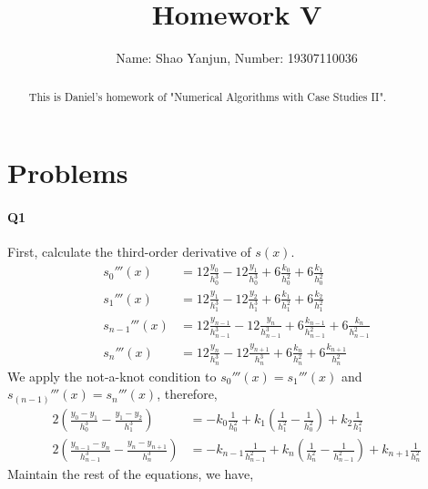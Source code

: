 \documentclass[11pt]{article}
\title{Homework V}
\author{Name: Shao Yanjun, Number: 19307110036}
\begin{document}
\maketitle

\begin{abstract}
This is Daniel's homework of  "Numerical Algorithms with Case Studies II".
\end{abstract}
\section{Problems}
\paragraph{Q1}
First, calculate the third-order derivative of $s(x)$.
\begin{align}
	s_0'''(x)&=12\frac{y_0}{h_0^3}-12\frac{y_1}{h_0^3}+6\frac{k_0}{h_0^2}+6\frac{k_1}{h_0^2}\\
	s_1'''(x)&=12\frac{y_1}{h_1^3}-12\frac{y_2}{h_1^3}+6\frac{k_1}{h_1^2}+6\frac{k_2}{h_1^2}\\
	s_{n-1}'''(x)&=12\frac{y_{n-1}}{h_{n-1}^3}-12\frac{y_{n}}{h_{n-1}^3}+6\frac{k_{n-1}}{h_{n-1}^2}+6\frac{k_{n}}{h_{n-1}^2}\\
	s_{n}'''(x)&=12\frac{y_{n}}{h_{n}^3}-12\frac{y_{n+1}}{h_{n}^3}+6\frac{k_{n}}{h_{n}^2}+6\frac{k_{n+1}}{h_{n}^2}
\end{align}
We apply the not-a-knot condition to $s_0'''(x)=s_1'''(x)$ and $s_(n-1)'''(x)=s_n'''(x)$, therefore,
\begin{align}
	2(\frac{y_0-y_1}{h_0^3}-\frac{y_1-y_2}{h_1^3})&=-k_0\frac{1}{h_0^2}+k_1(\frac{1}{h_1^2}-\frac{1}{h_0^2})+k_2\frac{1}{h_1^2}\\
	2(\frac{y_{n-1}-y_n}{h_{n-1}^3}-\frac{y_{n}-y_{n+1}}{h_n^3})&=-k_{n-1}\frac{1}{h_{n-1}^2}+k_n(\frac{1}{h_{n}^2}-\frac{1}{h_{n-1}^2})+k_{n+1}\frac{1}{h_{n}^2}
\end{align}
Maintain the rest of the equations, we have,
\end{document}
